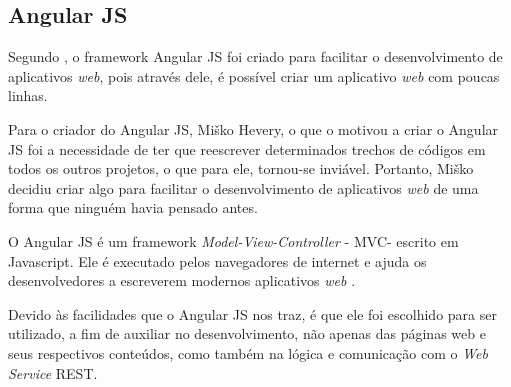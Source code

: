 \subsection{Angular JS}

Segundo , o framework Angular JS foi criado para facilitar o desenvolvimento de aplicativos \textit{web}, pois através dele, é possível criar um aplicativo \textit{web} com poucas linhas.

Para o criador do Angular JS, Miško Hevery, o que o motivou a criar o Angular JS foi a necessidade de ter que reescrever determinados trechos de códigos em todos os outros projetos, o que para ele, tornou-se inviável. Portanto, Miško decidiu criar algo para facilitar o desenvolvimento de aplicativos \textit{web} de uma forma que ninguém havia pensado antes.

O Angular JS é um framework \textit{Model-View-Controller} - MVC\footnotemark[30] - escrito em Javascript. Ele é executado pelos navegadores de internet e ajuda os desenvolvedores a escreverem modernos aplicativos \textit{web} \cite{kozlowski_darwin_mastering_web_application_angular_js}.


Devido às facilidades que o Angular JS nos traz, é que ele foi escolhido para ser utilizado, a fim de auxiliar no desenvolvimento, não apenas das páginas web e seus respectivos conteúdos, como também na lógica e comunicação com o \textit{Web Service} REST.
